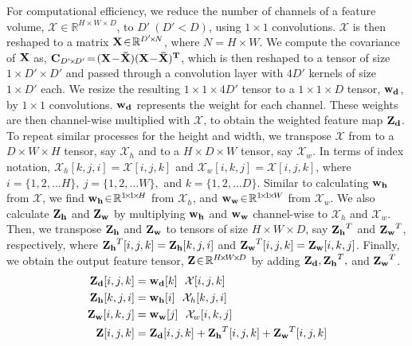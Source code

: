 \documentclass[10pt,twocolumn,letterpaper]{article}
\begin{document}
For computational efficiency, we reduce the number of channels of a feature volume, $\mathcal{X} \!\in\! \mathbb{R}^{H \!\times\! W \!\times\! D}$, to $D'~(D'\!<\!D)$, using $1\!\times\!1$ convolutions. $\mathcal{X}$ is then reshaped to a matrix $\vb{X} \!\in\! \mathbb{R}^{D'\!\times\! N}$, where $N\!=\!H\!\times\! W$. We compute the covariance of $\vb{X}$ as, $\vb{C}_{D'\!\times\!D'} \!=\! (\vb{X\!-\!\bar{X}})\vb{(X\!-\!\bar{X})^T}$, which is then reshaped to a tensor of size $1 \!\times\! D' \!\times\! D'$ and passed through a convolution layer with $4D'$ kernels of size $1 \!\times\! D'$ each. We resize the resulting $1\!\times\! 1 \!\times\! 4D'$ tensor to a $1\!\times\! 1 \!\times\! D$ tensor, $\vb{w_d}$, by $1\!\times\! 1$ convolutions. $\vb{w_d}$ represents the weight for each channel. These weights are then channel-wise multiplied with $\mathcal{X}$, to obtain the weighted feature map $\vb{Z_d}$. To repeat similar processes for the height and width, we transpose $\mathcal{X}$ from to a $D \!\times\! W \!\times\! H$ tensor, say $\mathcal{X}_h$ and to a $H \!\times\! D \!\times\! W$ tensor, say $\mathcal{X}_w$. In terms of index notation, $\mathcal{X}_h[k,j,i] \!=\! \mathcal{X}[i,j,k]$ and $\mathcal{X}_w[i,k,j] \!=\! \mathcal{X}[i,j,k]$, where $i\!=\!\{1,2,\ldots H\}, ~j\!=\!\{1,2,\ldots W\},$ and $k\!=\!\{1,2,\ldots D\}$. Similar to calculating $\vb{w_h}$ from $\mathcal{X}$, we find $\vb{w_h}\!\in\! \mathbb{R}^{1\!\times\!1\!\times\!H}$ from $\mathcal{X}_h$, and $\vb{w_w}\!\in\! \mathbb{R}^{1\!\times\!1\!\times\!W}$ from $\mathcal{X}_w$. We also calculate $\vb{Z_h}$ and $\vb{Z_w}$ by multiplying $\vb{w_h}$ and $\vb{w_w}$ channel-wise to $\mathcal{X}_h$ and $\mathcal{X}_w$. Then, we transpose $\vb{Z_h}$ and $\vb{Z_w}$ to tensors of size $H\!\times\! W \!\times\! D$, say $\vb{Z_h}^T$ and $\vb{Z_w}^T$, respectively, where $\vb{Z_h}^T[i,j,k] = \vb{Z_h}[k,j,i]$ and $\vb{Z_w}^T[i,j,k] = \vb{Z_w}[i,k,j]$. Finally, we obtain the output feature tensor, $\vb{Z} \!\in\! \mathbb{R}^{H\!\times\! W \!\times\! D}$ by adding $\vb{Z_d}, \vb{Z_h}^T,$ and $\vb{Z_w}^T$. 
\vspace{-0.5em}
\begin{align}
    \vb{Z_d}[i,j,k] &= \vb{w_d}[k] ~~ \mathcal{X}[i,j,k] \\
    \vb{Z_h}[k,j,i] &= \vb{w_h}[i] ~~ \mathcal{X}_h[k,j,i]  \\
    \vb{Z_w}[i,k,j] &= \vb{w_w}[j] ~~ \mathcal{X}_w[i,k,j]  \\
    \vb{Z}[i,j,k] &= \vb{Z_d}[i,j,k] + \vb{Z_h}^T[i,j,k] + \vb{Z_w}^T[i,j,k]
\end{align}
\vspace{-1em}
\end{document}
